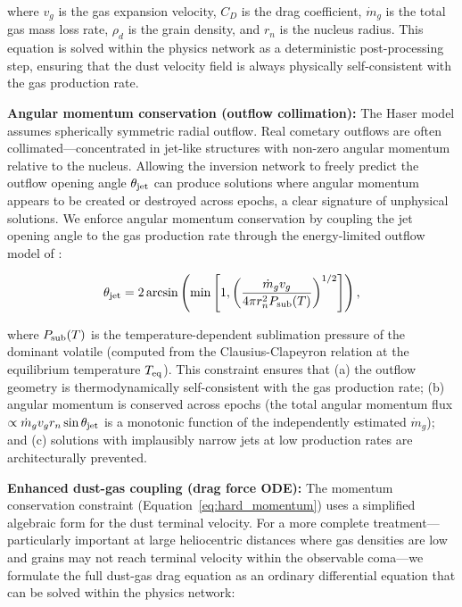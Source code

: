 \documentclass[usenatbib]{mnras}
\begin{document}
where $v_g$ is the gas expansion velocity, $C_D$ is the drag coefficient, $\dot{m}_g$ is the total gas mass loss rate, $\rho_d$ is the grain density, and $r_n$ is the nucleus radius. This equation is solved within the physics network as a deterministic post-processing step, ensuring that the dust velocity field is always physically self-consistent with the gas production rate.

\textbf{Angular momentum conservation (outflow collimation):} The Haser model assumes spherically symmetric radial outflow. Real cometary outflows are often collimated---concentrated in jet-like structures with non-zero angular momentum relative to the nucleus. Allowing the inversion network to freely predict the outflow opening angle $\theta_{\rm jet}$ can produce solutions where angular momentum appears to be created or destroyed across epochs, a clear signature of unphysical solutions. We enforce angular momentum conservation by coupling the jet opening angle to the gas production rate through the energy-limited outflow model of \citet{belton07}:

\begin{equation}\label{eq:hard_angular}
\theta_{\rm jet} = 2 \arcsin\left(\min\left[1, \left(\frac{\dot{m}_g v_g}{4 \pi r_n^2 P_{\rm sub}(T)}\right)^{1/2}\right]\right),
\end{equation}

where $P_{\rm sub}(T)$ is the temperature-dependent sublimation pressure of the dominant volatile (computed from the Clausius-Clapeyron relation at the equilibrium temperature $T_{\rm eq}$). This constraint ensures that (a) the outflow geometry is thermodynamically self-consistent with the gas production rate; (b) angular momentum is conserved across epochs (the total angular momentum flux $\propto \dot{m}_g v_g r_n \sin\theta_{\rm jet}$ is a monotonic function of the independently estimated $\dot{m}_g$); and (c) solutions with implausibly narrow jets at low production rates are architecturally prevented.

\textbf{Enhanced dust-gas coupling (drag force ODE):} The momentum conservation constraint (Equation~\ref{eq:hard_momentum}) uses a simplified algebraic form for the dust terminal velocity. For a more complete treatment---particularly important at large heliocentric distances where gas densities are low and grains may not reach terminal velocity within the observable coma---we formulate the full dust-gas drag equation as an ordinary differential equation that can be solved within the physics network:
\end{document}
